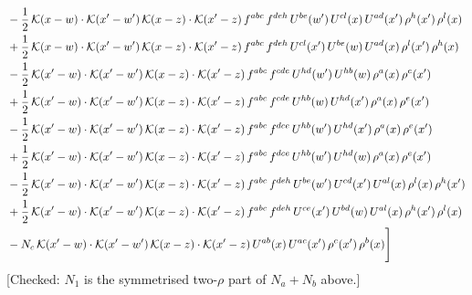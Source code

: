 \documentclass[9pt]{article}
\numberwithin{equation}{section}
\begin{document}
\begin{align}
& -\frac{1}{2}\,\mathcal{K}(x-w)\cdot\mathcal{K}(x'-w')\,\mathcal{K}(x-z)\cdot\mathcal{K}(x'-z)\,f^{abc}\,f^{deh}\,U^{be}(w')\,U^{cl}(x)\,U^{ad}(x')\,\rho^{h}(x')\,\rho^{l}(x)\notag\\
& +\frac{1}{2}\,\mathcal{K}(x-w)\cdot\mathcal{K}(x'-w')\,\mathcal{K}(x-z)\cdot\mathcal{K}(x'-z)\,f^{abc}\,f^{deh}\,U^{cl}(x')\,U^{be}(w)\,U^{ad}(x)\,\rho^{l}(x')\,\rho^{h}(x)\notag\\
& -\frac{1}{2}\,\mathcal{K}(x'-w)\cdot\mathcal{K}(x'-w')\,\mathcal{K}(x-z)\cdot\mathcal{K}(x'-z)\,f^{abc}\,f^{cde}\,U^{hd}(w')\,U^{hb}(w)\,\rho^{a}(x)\,\rho^{e}(x')\notag\\
& +\frac{1}{2}\,\mathcal{K}(x'-w)\cdot\mathcal{K}(x'-w')\,\mathcal{K}(x-z)\cdot\mathcal{K}(x'-z)\,f^{abc}\,f^{cde}\,U^{hb}(w)\,U^{hd}(x')\,\rho^{a}(x)\,\rho^{e}(x')\notag\\
& -\frac{1}{2}\,\mathcal{K}(x'-w)\cdot\mathcal{K}(x'-w')\,\mathcal{K}(x-z)\cdot\mathcal{K}(x'-z)\,f^{abc}\,f^{dce}\,U^{hb}(w')\,U^{hd}(x')\,\rho^{a}(x)\,\rho^{e}(x')\notag\\
& +\frac{1}{2}\,\mathcal{K}(x'-w)\cdot\mathcal{K}(x'-w')\,\mathcal{K}(x-z)\cdot\mathcal{K}(x'-z)\,f^{abc}\,f^{dce}\,U^{hb}(w')\,U^{hd}(w)\,\rho^{a}(x)\,\rho^{e}(x')\notag\\
& -\frac{1}{2}\,\mathcal{K}(x'-w)\cdot\mathcal{K}(x'-w')\,\mathcal{K}(x-z)\cdot\mathcal{K}(x'-z)\,f^{abc}\,f^{deh}\,U^{be}(w')\,U^{cd}(x')\,U^{al}(x)\,\rho^{l}(x)\,\rho^{h}(x')\notag\\
& +\frac{1}{2}\,\mathcal{K}(x'-w)\cdot\mathcal{K}(x'-w')\,\mathcal{K}(x-z)\cdot\mathcal{K}(x'-z)\,f^{abc}\,f^{deh}\,U^{ce}(x')\,U^{bd}(w)\,U^{al}(x)\,\rho^{h}(x')\,\rho^{l}(x)\notag\\
& -N_{c}\,\mathcal{K}(x'-w)\cdot\mathcal{K}(x'-w')\,\mathcal{K}(x-z)\cdot\mathcal{K}(x'-z)\,U^{ab}(x)\,U^{ac}(x')\,\rho^{c}(x')\,\rho^{b}(x)\Bigg]
\end{align} {\color{red}[Checked: $N_{1}$ is the symmetrised two-$\rho$ part of $N_{a}+N_{b}$ above.]}\par\noindent 
\end{document}
